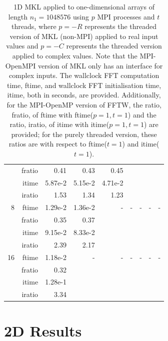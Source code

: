 \documentclass[a4]{article}
\begin{document}
\begin{table}
\begin{center}
\begin{tabular}{|r|r|r|r|r|r|r|r|r|}
      & fratio &   0.41 &   0.43 &   0.45 &    &  &  &  \\
      & itime &    5.87e-2 &   5.15e-2 &   4.71e-2 &   & & & \\
      & iratio &  1.53 &   1.34 &   1.23 &     & & &  \\ \hline
    8  & ftime &   1.29e-2 &   1.36e-2 &    - & - & - & - & - \\ 
      & fratio &    0.35 &   0.37 &    &  &  &  &  \\
      & itime &    9.15e-2 &   8.33e-2 &       & & & & \\
      & iratio &    2.39 &   2.17 &      & & & & \\ \hline
    16 & ftime  &  1.18e-2 &      - & - & - & - & - & - \\ 
     & fratio &    0.32 &    &  &  &  &  &  \\
      & itime &    1.28e-1 &     & & & & & \\
      & iratio &   3.34 &    & & & & & \\ \hline
\end{tabular}
\caption{1D MKL applied to one-dimensional arrays of length $n_1=1048576$ using $p$ MPI processes and $t$ threads, where $p=-R$ represents the threaded version of MKL (non-MPI) applied to real input values and $p=-C$ represents the threaded version applied to complex values. Note that the MPI-OpenMPI version of MKL only has an interface for complex inputs. The wallclock FFT computation time, ftime, and wallclock FFT initialisation time, itime, both in seconds, are provided. Additionally, for the MPI-OpenMP version of FFTW, the ratio, fratio, of ftime  with ftime($p=1,t=1$) and the ratio, iratio, of itime  with itime($p=1,t=1$) are provided; for the purely threaded version, these ratios are with respect to ftime($t=1$) and itime($t=1$). }\label{Tbl:MKL1d1048576}
\end{center}
\end{table}





\section{2D Results}






\end{document}
